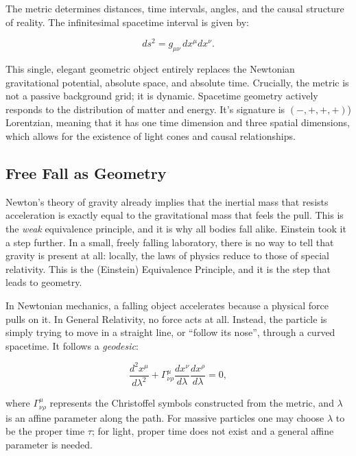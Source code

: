 The metric determines distances, time intervals, angles, and the causal structure of reality.
The infinitesimal spacetime interval is given by:

\begin{equation}
ds^2 = g_{\mu\nu} \, dx^\mu dx^\nu.
\end{equation}

This single, elegant geometric object entirely replaces the Newtonian gravitational potential, absolute space, and absolute time.
Crucially, the metric is not a passive background grid; it is dynamic.
Spacetime geometry actively responds to the distribution of matter and energy. It's signature is $(-,+,+,+)$) Lorentzian, 
meaning that it has one time dimension and three spatial dimensions, which allows for the existence of light cones and causal relationships. 


\subsection*{Free Fall as Geometry}

Newton's theory of gravity already implies that the inertial mass that resists acceleration is exactly equal to the gravitational mass that feels the pull. 
This is the \emph{weak} equivalence principle, and it is why all bodies fall alike.
Einstein took it a step further. In a small, freely falling laboratory, there is no way to tell that gravity is present at all: locally, the laws of physics reduce to those of special relativity.
This is the (Einstein) Equivalence Principle, and it is the step that leads to geometry.

In Newtonian mechanics, a falling object accelerates because a physical force pulls on it.
In General Relativity, no force acts at all.
Instead, the particle is simply trying to move in a straight line, or ``follow its nose'', through a curved spacetime.
It follows a \emph{geodesic}:

\begin{equation}
\frac{d^2 x^\mu}{d\lambda^2} + \Gamma^\mu_{\nu\rho} \frac{dx^\nu}{d\lambda} \frac{dx^\rho}{d\lambda} = 0,
\end{equation}

where $\Gamma^\mu_{\nu\rho}$ represents the Christoffel symbols constructed from the metric, and $\lambda$ is an affine parameter along the path.
For massive particles one may choose $\lambda$ to be the proper time $\tau$; for light, proper time does not exist and a general affine parameter is needed.

